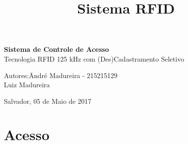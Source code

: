 \documentclass[a4paper, 12pt]{article}
\title{Sistema RFID}
\begin{document}

\begin{titlepage}
	\begin{center}


\vspace{10pt}
        
        \vspace{85pt}
        
		\textbf{\LARGE{Sistema de Controle de Acesso}}\\
		\large{Tecnologia RFID 125 kHz com (Des)Cadastramento Seletivo}
		\vspace{8cm}
		
	\end{center}
	
	\begin{flushleft}
		\begin{tabbing}
			Autores:\qquad\= André Madureira - 215215129\\
			\>Luiz Madureira\\
		
	\end{tabbing}		  
	\end{flushleft}
	
	\begin{center}
		\vspace{\fill}
		Salvador, 05 de Maio de 2017
	\end{center}
\end{titlepage}
\newpage
\tableofcontents
\thispagestyle{empty}

\newpage
{}

\section{Acesso}
\end{document}
